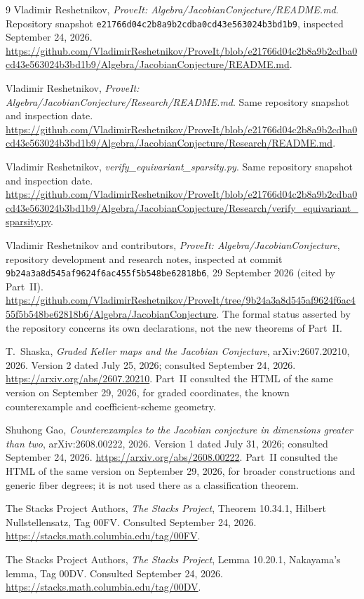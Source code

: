 \documentclass[11pt,a4paper]{article}
\numberwithin{equation}{section}
\theoremstyle{definition}
\theoremstyle{remark}
\begin{document}
\begin{thebibliography}{9}
\small
{}
Vladimir Reshetnikov, \emph{ProveIt: Algebra/JacobianConjecture/README.md}.
Repository snapshot \texttt{e21766d04c2b8a9b2cdba0cd43e563024b3bd1b9},
inspected September 24, 2026.
\url{https://github.com/VladimirReshetnikov/ProveIt/blob/e21766d04c2b8a9b2cdba0cd43e563024b3bd1b9/Algebra/JacobianConjecture/README.md}.

Vladimir Reshetnikov, \emph{ProveIt: Algebra/JacobianConjecture/Research/README.md}.
Same repository snapshot and inspection date.
\url{https://github.com/VladimirReshetnikov/ProveIt/blob/e21766d04c2b8a9b2cdba0cd43e563024b3bd1b9/Algebra/JacobianConjecture/Research/README.md}.

Vladimir Reshetnikov, \emph{verify\_equivariant\_sparsity.py}.
Same repository snapshot and inspection date.
\url{https://github.com/VladimirReshetnikov/ProveIt/blob/e21766d04c2b8a9b2cdba0cd43e563024b3bd1b9/Algebra/JacobianConjecture/Research/verify_equivariant_sparsity.py}.

Vladimir Reshetnikov and contributors,
\emph{ProveIt: Algebra/JacobianConjecture}, repository development and
research notes, inspected at commit
\nolinkurl{9b24a3a8d545af9624f6ac455f5b548be62818b6},
29 September 2026 (cited by Part~II).
\url{https://github.com/VladimirReshetnikov/ProveIt/tree/9b24a3a8d545af9624f6ac455f5b548be62818b6/Algebra/JacobianConjecture}.
The formal status asserted by the repository concerns its own
declarations, not the new theorems of Part~II.

T.~Shaska, \emph{Graded Keller maps and the Jacobian Conjecture},
arXiv:2607.20210, 2026. Version 2 dated July 25, 2026;
consulted September 24, 2026.
\url{https://arxiv.org/abs/2607.20210}.
Part~II consulted the HTML of the same version on September 29, 2026,
for graded coordinates, the known counterexample and coefficient-scheme
geometry.

Shuhong Gao, \emph{Counterexamples to the Jacobian conjecture in dimensions
greater than two}, arXiv:2608.00222, 2026. Version 1 dated July 31, 2026;
consulted September 24, 2026.
\url{https://arxiv.org/abs/2608.00222}.
Part~II consulted the HTML of the same version on September 29, 2026,
for broader constructions and generic fiber degrees; it is not used there
as a classification theorem.

The Stacks Project Authors, \emph{The Stacks Project},
Theorem 10.34.1, Hilbert Nullstellensatz, Tag 00FV.
Consulted September 24, 2026.
\url{https://stacks.math.columbia.edu/tag/00FV}.

The Stacks Project Authors, \emph{The Stacks Project},
Lemma 10.20.1, Nakayama's lemma, Tag 00DV.
Consulted September 24, 2026.
\url{https://stacks.math.columbia.edu/tag/00DV}.
\end{thebibliography}
\end{document}
